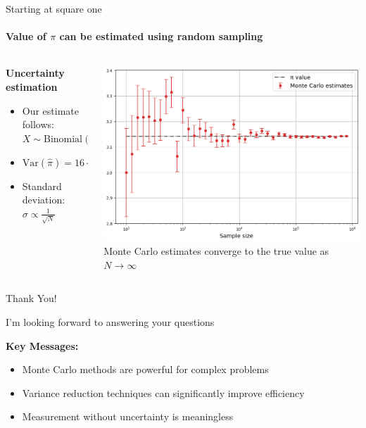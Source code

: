 \documentclass{beamer}
\begin{document}
\begin{frame}{Starting at square one}
  \framesubtitle{Value of $\pi$ can be estimated using random sampling}

  \begin{columns}[c]
    \begin{column}{0.4\textwidth}
      \textbf{Uncertainty estimation}
      \begin{itemize}
        \item Our estimate follows: $X \sim \text{Binomial}(N, p)$
        \item $\text{Var}(\hat{\pi}) = 16 \cdot \frac{p(1-p)}{N}$
        \item Standard deviation: $\sigma \propto \frac{1}{\sqrt{N}}$
      \end{itemize}
    \end{column}
    \begin{column}{0.6\textwidth}
      \begin{center}
        \includegraphics[width=\textwidth]{images/pi_convergence.png}
        \\[0.2cm]
        \small{Monte Carlo estimates converge to the true value as $N \to \infty$}
      \end{center}
    \end{column}
  \end{columns}
\end{frame}

\begin{frame}{Thank You!}
  \begin{center}
    \Large{I'm looking forward to answering your questions}
    
    \vspace{1cm}
    
    \textbf{Key Messages:}
    \begin{itemize}
      \item Monte Carlo methods are powerful for complex problems
      \item Variance reduction techniques can significantly improve efficiency
      \item Measurement without uncertainty is meaningless
    \end{itemize}
  \end{center}
\end{frame}
\end{document}
